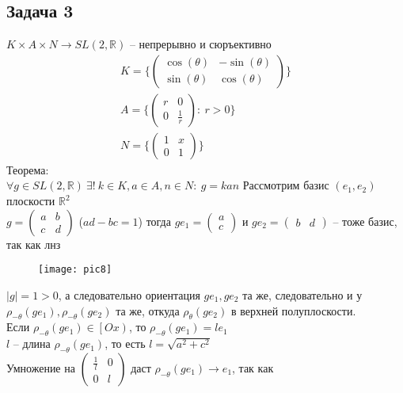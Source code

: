 \subsection*{Задача 3}
	$K \times A \times N \to SL(2,\mathbb{R})$ -- непрерывно и сюръективно
	\begin{gather*}
		K = 
		\Bigg\{
		\begin{pmatrix}
		\cos(\theta) & -\sin(\theta)\\
		\sin(\theta) & \cos(\theta)
		\end{pmatrix}
		\Bigg\}\\
		A = 
		\Bigg\{
		\begin{pmatrix}
		r & 0 \\ 0 & \frac{1}{r}
		\end{pmatrix}
		:\ r > 0
		\Bigg\}\\
		N = 
		\Bigg\{
		\begin{pmatrix}
		1 & x \\ 0 & 1
		\end{pmatrix}
		\Bigg\}
	\end{gather*}
	Теорема:\\
	$\forall g \in SL(2,\mathbb{R})\ \exists!\ k \in K, a \in A, n \in N:\ g = kan$
	\vskip 0.2in
	Рассмотрим базис $(e_1,e_2)$ плоскости $\mathbb{R}^2$\\
	$g = \begin{pmatrix} a & b \\ c & d \end{pmatrix}$ ($ad - bc = 1$) тогда $ge_1 = \begin{pmatrix} a \\ c \end{pmatrix}$ и $ge_2 = \begin{pmatrix} b & d \end{pmatrix}$ -- тоже базис, так как лнз\\
	\begin{figure}[!h]
		\texttt{[image: pic8]}
	\end{figure}
	$|g| = 1 > 0$, а следовательно ориентация $ge_1, ge_2$ та же, следовательно и у $\rho_{-\theta}(ge_1), \rho_{-\theta}(ge_2)$ та же, откуда $\rho_{\theta}(ge_2)$ в верхней полуплоскости.\\
	Если $\rho_{-\theta}(ge_1) \in \left[Ox\right)$, то $\rho_{-\theta}(ge_1) = le_1$\\
	$l$ -- длина $\rho_{-\theta}(ge_1)$, то есть $l = \sqrt{a^2 + c^2}$\\
	Умножение на $\begin{pmatrix} \frac{1}{l} & 0 \\ 0 & l \end{pmatrix}$ даст $\rho_{-\theta}(ge_1) \to e_1$, так как
